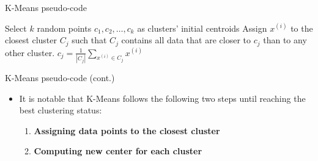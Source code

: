 \documentclass[serif, aspectratio=169]{beamer}
\begin{document}
\begin{frame}{K-Means pseudo-code}
    \begin{algorithm}[H]
    \caption{K-Means}\label{alg:K-Means}
    \begin{algorithmic}[1]
    \STATE Select $k$ random points $c_1, c_2, \ldots, c_k$ as clusters' initial centroids 
    \REPEAT 
        \STATE Assign $x^{(i)}$ to the closest cluster $C_j$ such that $C_j$ contains all data that are closer to $c_j$ than to any other cluster.
    \ENDFOR
        \STATE $c_j = \frac{1}{|C_j|} \sum_{x^{(i)} \in C_j} x^{(i)}$
    \ENDFOR
    \end{algorithmic}
    \end{algorithm}
\end{frame}

\begin{frame}{K-Means pseudo-code (cont.)}
    \begin{itemize}
        \item It is notable that K-Means follows the following two steps until reaching the best clustering status:
        \begin{enumerate}
            \item \textbf{Assigning data points to the closest cluster}
            \item \textbf{Computing new center for each cluster}
        \end{enumerate}
    \end{itemize}
\end{frame}
\end{document}
